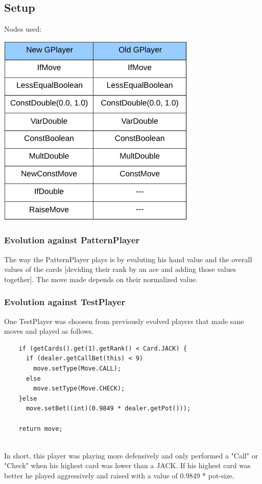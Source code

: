 \documentclass[12pt,fleqn,a4paper]{article}
\begin{document}
\subsection{Setup}
Nodes used:
\begin{flushleft}
	\includegraphics[width=.3\textwidth,left]{node_table.png}
\end{flushleft}	

\subsubsection{Evolution against PatternPlayer}
The way the PatternPlayer plays is by evaluting his hand value and the overall values of the cards [deviding their rank by an ace and adding those values together].
The move made depends on their normalized value.

\subsubsection{Evolution against TestPlayer}
One TestPlayer was choosen from previously evolved players that made sane moves and played as follows.
\\
\begin{lstlisting}
	if (getCards().get(1).getRank() < Card.JACK) {
	  if (dealer.getCallBet(this) < 9)
		move.setType(Move.CALL);
	  else
		move.setType(Move.CHECK);
	}else
	  move.setBet((int)(0.9849 * dealer.getPot()));
		
	return move;
\end{lstlisting}
\\
In short, this player was playing more defensively and only performed a "Call" or "Check" when his highest card was lower than a JACK. If his highest card was better he played aggressively and raised with a value of 0.9849 * pot-size.

\newpage
\end{document}
